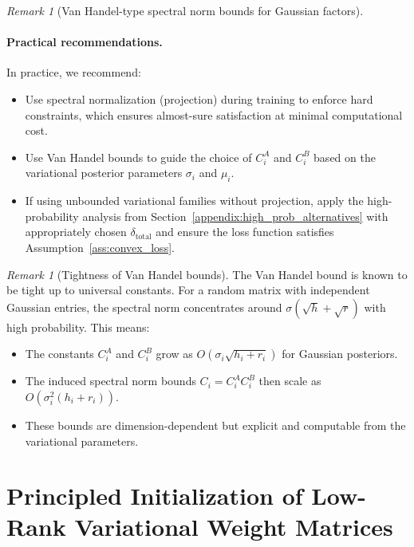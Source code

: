 \documentclass{article}
\theoremstyle{plain}
\theoremstyle{definition}
\theoremstyle{remark}
\newtheorem{remark}[theorem]{Remark}
\begin{document}
\begin{remark}[Van Handel-type spectral norm bounds for Gaussian factors]
\paragraph{Practical recommendations.} In practice, we recommend:
\begin{itemize}
    \item Use spectral normalization (projection) during training to enforce hard constraints, which ensures almost-sure satisfaction at minimal computational cost.
    \item Use Van Handel bounds to guide the choice of $C_i^A$ and $C_i^B$ based on the variational posterior parameters $\sigma_i$ and $\mu_i$.
    \item If using unbounded variational families without projection, apply the high-probability analysis from Section~\ref{appendix:high_prob_alternatives} with appropriately chosen $\delta_{\text{total}}$ and ensure the loss function satisfies Assumption~\ref{ass:convex_loss}.
\end{itemize}
\end{remark}

\begin{remark}[Tightness of Van Handel bounds]
The Van Handel bound is known to be tight up to universal constants. For a random matrix with independent Gaussian entries, the spectral norm concentrates around $\sigma(\sqrt{h} + \sqrt{r})$ with high probability. This means:
\begin{itemize}
    \item The constants $C_i^A$ and $C_i^B$ grow as $O(\sigma_i \sqrt{h_i + r_i})$ for Gaussian posteriors.
    \item The induced spectral norm bounds $C_i = C_i^A C_i^B$ then scale as $O(\sigma_i^2 (h_i + r_i))$.
    \item These bounds are dimension-dependent but explicit and computable from the variational parameters.
\end{itemize}
\end{remark}


\section{Principled Initialization of Low-Rank Variational Weight Matrices}\label{sec:low_rank_initialization}
\end{document}
